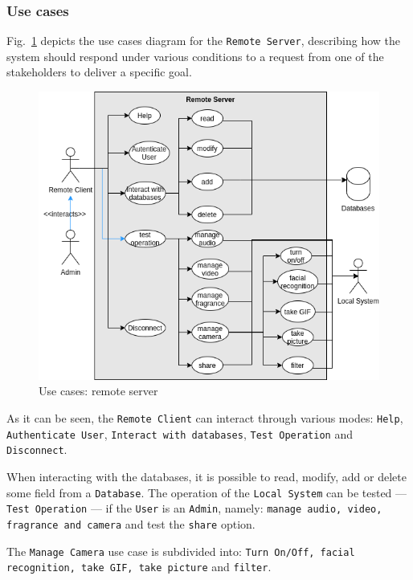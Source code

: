 \subsubsection{Use cases}
\label{sec:use-cases-2}
%
Fig.~\ref{fig:use-cases-rs} depicts the use cases diagram for the \texttt{Remote Server}, describing how the system should respond under various conditions to a request from one of the stakeholders to deliver a specific
goal.

\begin{figure}[htb!]
\centering
    \includegraphics[width=0.6\columnwidth]{./img/use-cases-rs.png}
  \caption{Use cases: remote server}%
\label{fig:use-cases-rs}
\end{figure}

As it can be seen, the \texttt{Remote Client} can interact through various
modes: \texttt{Help}, \texttt{Authenticate User}, \texttt{Interact with
  databases}, \texttt{Test Operation} and \texttt{Disconnect}.

When interacting with the databases, it is possible to read, modify, add or delete some field from a \texttt{Database}.
The operation of the \texttt{Local System} can be tested --- \texttt{Test
  Operation} --- if the \texttt{User} is an \texttt{Admin}, namely:
\texttt{manage audio, video, fragrance and camera} and test the \texttt{share} option.

The \texttt{Manage Camera} use case is subdivided into: \texttt{Turn On/Off, facial recognition, take GIF, take picture} and \texttt{filter}.

